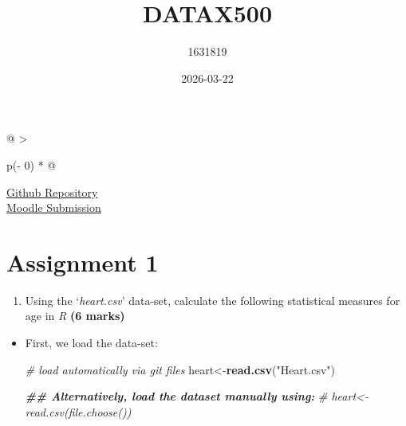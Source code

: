 \documentclass[
]{article}
\title{DATAX500}
\author{1631819}
\date{2026-03-22}
\newenvironment{Shaded}{\begin{snugshade}}{\end{snugshade}}
\newcommand{\CommentTok}[1]{\textcolor[rgb]{0.56,0.35,0.01}{\textit{#1}}}
\newcommand{\DocumentationTok}[1]{\textcolor[rgb]{0.56,0.35,0.01}{\textbf{\textit{#1}}}}
\newcommand{\FunctionTok}[1]{\textcolor[rgb]{0.13,0.29,0.53}{\textbf{#1}}}
\newcommand{\NormalTok}[1]{#1}
\newcommand{\OtherTok}[1]{\textcolor[rgb]{0.56,0.35,0.01}{#1}}
\newcommand{\StringTok}[1]{\textcolor[rgb]{0.31,0.60,0.02}{#1}}
\providecommand{\tightlist}{%
  \setlength{\itemsep}{0pt}\setlength{\parskip}{0pt}}
\begin{document}
\maketitle

\begin{longtable}[]{@{}
  >{\raggedright\arraybackslash}p{}@{}}
\toprule\noalign{}
\endhead
\bottomrule\noalign{}
\endlastfoot
\href{https://github.com/BrewBarred/DATAX500_A1}{Github Repository} \\
\href{https://elearn.waikato.ac.nz/mod/assign/view.php?id=2241094&action=editsubmission}{Moodle
Submission} \\
\end{longtable}

\section{Assignment 1}\label{assignment-1}

\begin{enumerate}
\def\labelenumi{\arabic{enumi}.}
\tightlist
\item
  Using the `\emph{heart.csv}' data-set, calculate the following
  statistical measures for age in \emph{R} \textbf{(6 marks)}
\end{enumerate}

\begin{itemize}
\item
  First, we load the data-set:

\begin{Shaded}
\begin{Highlighting}[]
\CommentTok{\# load automatically via git files}
\NormalTok{heart}\OtherTok{\textless{}{-}}\FunctionTok{read.csv}\NormalTok{(}\StringTok{"Heart.csv"}\NormalTok{)}


\DocumentationTok{\#\# Alternatively, load the dataset manually using:}
\CommentTok{\# heart\textless{}{-}read.csv(file.choose())}
\end{Highlighting}
\end{Shaded}
\end{itemize}
\end{document}
